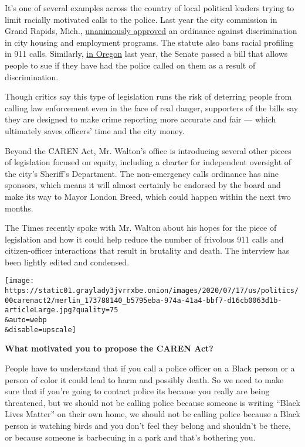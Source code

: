 It's one of several examples across the country of local political
leaders trying to limit racially motivated calls to the police. Last
year the city commission in Grand Rapids, Mich.,
\href{https://www.mlive.com/news/grand-rapids/2020/07/grand-rapids-already-has-a-caren-act-outlawing-racially-biased-911-calls.html}{unanimously
approved} an ordinance against discrimination in city housing and
employment programs. The statute also bans racial profiling in 911
calls. Similarly,
\href{https://www.opb.org/news/article/oregon-senate-passes-bill-prevents-racially-motivated-911-calls/}{in
Oregon} last year, the Senate passed a bill that allows people to sue if
they have had the police called on them as a result of discrimination.

Though critics say this type of legislation runs the risk of deterring
people from calling law enforcement even in the face of real danger,
supporters of the bills say they are designed to make crime reporting
more accurate and fair --- which ultimately saves officers' time and the
city money.

Beyond the CAREN Act, Mr. Walton's office is introducing several other
pieces of legislation focused on equity, including a charter for
independent oversight of the city's Sheriff's Department. The
non-emergency calls ordinance has nine sponsors, which means it will
almost certainly be endorsed by the board and make its way to Mayor
London Breed, which could happen within the next two months.

The Times recently spoke with Mr. Walton about his hopes for the piece
of legislation and how it could help reduce the number of frivolous 911
calls and citizen-officer interactions that result in brutality and
death. The interview has been lightly edited and condensed.

\texttt{[image: https://static01.graylady3jvrrxbe.onion/images/2020/07/17/us/politics/00carenact2/merlin\_173788140\_b5795eba-974a-41a4-bbf7-d16cb0063d1b-articleLarge.jpg?quality=75\\\&auto=webp\\\&disable=upscale]}

\textbf{What motivated you to propose the CAREN Act?}

People have to understand that if you call a police officer on a Black
person or a person of color it could lead to harm and possibly death. So
we need to make sure that if you're going to contact police its because
you really are being threatened, but we should not be calling police
because someone is writing ``Black Lives Matter'' on their own home, we
should not be calling police because a Black person is watching birds
and you don't feel they belong and shouldn't be there, or because
someone is barbecuing in a park and that's bothering you.

